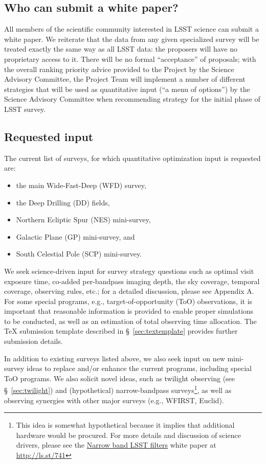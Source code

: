 \documentclass[DM,lsstdraft,toc,usenatbib]{lsstdoc}
\begin{document}
\subsection{Who can submit a white paper?} 

All members of the scientific community interested in LSST science can submit a white paper. 
We reiterate that the data from any given specialized survey will be treated exactly the same 
way as all LSST data: the proposers will have no proprietary access to it. There will be no 
formal ``acceptance'' of proposals; with the overall ranking priority advice provided to the 
Project by the Science Advisory Committee, the Project Team will implement a number of
different strategies that will be used as quantitative input (``a menu of options'') by the 
Science Advisory Committee when recommending strategy for the initial phase of LSST survey. 


\subsection{Requested input \label{sec:reqinput}}

The current list of surveys, for which quantitative optimization input is requested are:
\begin{itemize}
\item the main Wide-Fast-Deep (WFD) survey,
\item the Deep Drilling (DD) fields,
\item Northern Ecliptic Spur (NES) mini-survey, 
\item Galactic Plane (GP) mini-survey, and
\item South Celestial Pole (SCP) mini-survey.
\end{itemize}

We seek science-driven input for survey strategy questions such as optimal visit exposure time,
co-added per-bandpass imaging depth, the sky coverage, temporal coverage, observing
rules, etc.; for a detailed discussion, please see Appendix A. For some special programs, 
e.g., target-of-opportunity (ToO) observations, it is important that reasonable
information is provided to enable proper simulations to be conducted, as well as an estimation
of total observing time allocation. The TeX submission template described in \S~\ref{sec:textemplate} 
provides further submission details. 

In addition to existing surveys listed above, we also seek input on new mini-survey ideas 
to replace and/or enhance the current programs, including special ToO programs. We also 
solicit novel ideas, such as twilight observing (see \S~\ref{sec:twilight}) 
and (hypothetical) narrow-bandpass surveys\footnote{This idea is somewhat hypothetical 
because it implies that additional hardware would be procured. For more details and 
discussion of science drivers, please see the \href{http://ls.st/741}{Narrow band LSST filters} white paper at \url{http://ls.st/741}}, 
as well as observing synergies with other major surveys (e.g., WFIRST, Euclid). 
\end{document}
